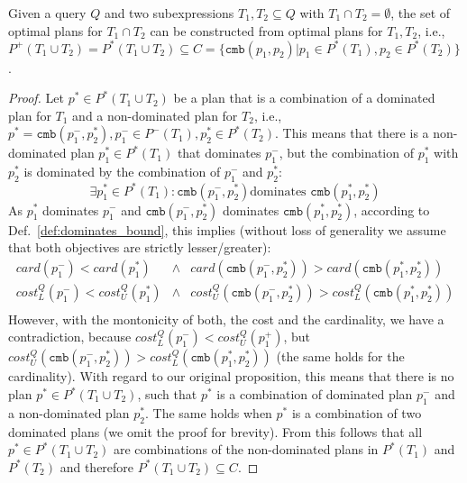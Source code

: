 
\begin{theorem}
  Given a query $Q$ and two subexpressions $T_1,T_2 \subseteq Q$ with
  $T_1 \cap T_2 = \emptyset$, the set of optimal plans for $T_1 \cap
  T_2$ can be constructed from optimal plans for $T_1,T_2$, i.e.,
  $P^+(T_1 \cup T_2) = P^*(T_1 \cup T_2) \subseteq C =
  \{\mathtt{cmb}(p_1,p_2) | p_1 \in P^*(T_1), p_2 \in P^*(T_2)\}$.
\end{theorem}
\begin{proof}
  Let $p^* \in P^*(T_1 \cup T_2)$ be a plan that is a combination of a
  dominated plan for $T_1$ and a non-dominated plan for $T_2$, i.e.,
  $p^* = \mathtt{cmb}(p^-_1,p^*_2),p^-_1 \in P^-(T_1),p^*_2 \in
  P^*(T_2)$. This means that there is a non-dominated plan $p^*_1 \in
  P^*(T_1)$ that dominates $p^-_1$, but the combination of $p^*_1$
  with $p^*_2$ is dominated by the combination of $p^-_1$ and $p^*_2$:
  \[ \exists p^*_1 \in P^*(T_1) : \mathtt{cmb}(p^-_1,p^*_2) \text{
    dominates } \mathtt{cmb}(p^*_1,p^*_2)\] As $p^*_1$ dominates
  $p^-_1$ and $\mathtt{cmb}(p^-_1,p^*_2)$ dominates
  $\mathtt{cmb}(p^*_1,p^*_2)$, according to
  Def.~\ref{def:dominates_bound}, this implies (without loss of
  generality we assume that both objectives are strictly
  lesser/greater):
  \begin{eqnarray*}
    card(p^-_1) < card(p^*_1) &\wedge& card (\mathtt{cmb}(p^-_1,p^*_2)) > card(\mathtt{cmb}(p^*_1,p^*_2)) \\
    cost^Q_L(p^-_1) < cost^Q_U(p^*_1) &\wedge& cost^Q_U(\mathtt{cmb}(p^-_1,p^*_2)) > cost^Q_L(\mathtt{cmb}(p^*_1,p^*_2))\\
  \end{eqnarray*}
  However, with the montonicity of both, the cost and the cardinality,
  we have a contradiction, because $cost^Q_L(p^-_1) <
  cost^Q_U(p^+_1)$, but $cost^Q_U(\mathtt{cmb}(p^-_1,p^*_2)) >
  cost^Q_L(\mathtt{cmb}(p^*_1,p^*_2))$ (the same holds for the
  cardinality). With regard to our original proposition, this means
  that there is no plan $p^* \in P^*(T_1 \cup T_2)$, such that $p^*$
  is a combination of dominated plan $p^-_1$ and a non-dominated plan
  $p^*_2$. The same holds when $p^*$ is a combination of two dominated
  plans (we omit the proof for brevity). From this follows that all
  $p^* \in P^*(T_1 \cup T_2)$ are combinations of the non-dominated
  plans in $P^*(T_1)$ and $P^*(T_2)$ and therefore $P^*(T_1 \cup T_2)
  \subseteq C$.
\end{proof}

